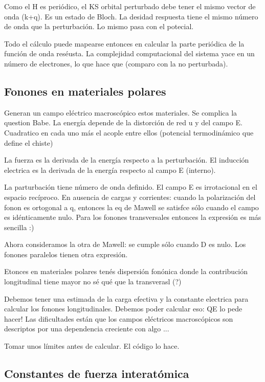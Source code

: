   Como el H es periódico, el KS orbital perturbado debe tener el mismo vector de onda (k+q). Es un estado de Bloch. La desidad respuesta tiene el mismo número de onda que la perturbación. Lo mismo pasa con el potecial.

  Todo el cálculo puede mapearse entonces en calcular la parte periódica de la función de onda reséusta. La complejidad computacional del sistema yace en un número de electrones, lo que hace que (comparo con la no perturbada).

\subsection{Fonones en materiales polares}

  Generan un campo eléctrico macroscópico estos materiales. Se complica la question Babe. La energía depende de la distorción de red u y del campo E. Cuadratico en cada uno más el acople entre ellos (potencial termodinámico que define el chiste)

  La fuerza es la derivada de la energía respecto a la perturbación. El inducción electrica es la derivada de la energía respecto al campo E (interno).

  La parturbación tiene número de onda definido. El campo E es irrotacional en el espacio recíproco. En ausencia de cargas y corrientes: cuando la polarización del fonon es ortogonal a q, entonces la eq de Mawell se satisfce sólo cuando el campo es idénticamente nulo. Para los fonones transversales entonces la expresión es más sencilla :)

  Ahora consideramos la otra de Mawell: se cumple sólo cuando D es nulo. Los fonones paralelos tienen otra expresión.

  Etonces en materiales polares tenés dispersión fonónica donde la contribución longitudinal tiene mayor no sé qué que la transverasl (?)

  Debemos tener una estimada de la carga efectiva y la constante electrica para calcular los fonones longitudinales. Debemos poder calcular eso: QE lo pede hacer! Las dificultades están que los campos eléctricos macroscópicos son descriptos por una dependencia creciente con algo ...

  Tomar unos límites antes de calcular. El código lo hace.

\subsection{Constantes de fuerza interatómica}

